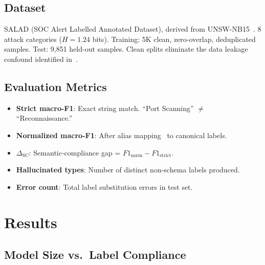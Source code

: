 \documentclass[review,3p]{elsarticle}
\begin{document}
\subsection{Dataset}
SALAD (SOC Alert Labelled Annotated Dataset), derived from UNSW-NB15~\cite{moustafa2016}. 8 attack categories ($H = 1.24$ bits). Training: 5K clean, zero-overlap, deduplicated samples. Test: 9,851 held-out samples. Clean splits eliminate the data leakage confound identified in~\cite{p22}.

\subsection{Evaluation Metrics}
\begin{itemize}
\item \textbf{Strict macro-F1}: Exact string match. ``Port Scanning'' $\neq$ ``Reconnaissance.''
\item \textbf{Normalized macro-F1}: After alias mapping~\cite{p3} to canonical labels.
\item \textbf{$\Delta_\text{SC}$}: Semantic-compliance gap = $F1_\text{norm} - F1_\text{strict}$.
\item \textbf{Hallucinated types}: Number of distinct non-schema labels produced.
\item \textbf{Error count}: Total label substitution errors in test set.
\end{itemize}

\section{Results}

\subsection{Model Size vs.\ Label Compliance}
\end{document}
